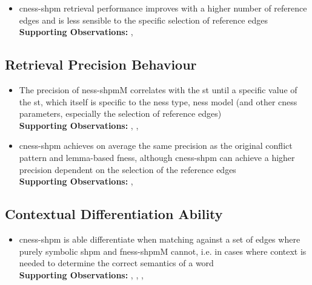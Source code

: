 \documentclass[11pt]{scrreprt}
\begin{document}
{\begin{itemize}
\item \gls{cness-shpm} retrieval performance improves with a higher number of reference edges and is less sensible to the specific selection of reference edges
\\ \textbf{Supporting Observations:} , 

\end{itemize}


\subsection{Retrieval Precision Behaviour}
\label{sec:result-retrieval-precision-behaviour}

\begin{itemize}
	\item The precision of \gls{ness-shpm}M correlates with the \gls{st} until a specific value of the \gls{st}, which itself is specific to the \gls{ness} type, \gls{ness} model (and other \gls{cness} parameters, especially the selection of reference edges)
\\ \textbf{Supporting Observations:} , , 

\item \gls{cness-shpm} achieves on average the same precision as the original conflict pattern and lemma-based \gls{fness}, although \gls{cness-shpm} can achieve a higher precision dependent on the selection of the reference edges \\
\textbf{Supporting Observations:} , 


\end{itemize}

\subsection{Contextual Differentiation Ability}
\label{sec:result-contextual-differentiation-ability}

\begin{itemize}
	\item \gls{cness-shpm} is able differentiate when matching against a set of edges where purely symbolic \gls{shpm} and \gls{fness-shpm}M cannot, i.e. in cases where context is needed to determine the correct semantics of a word \\
	\textbf{Supporting Observations:} , , , 
	

\end{itemize}}
\end{document}
